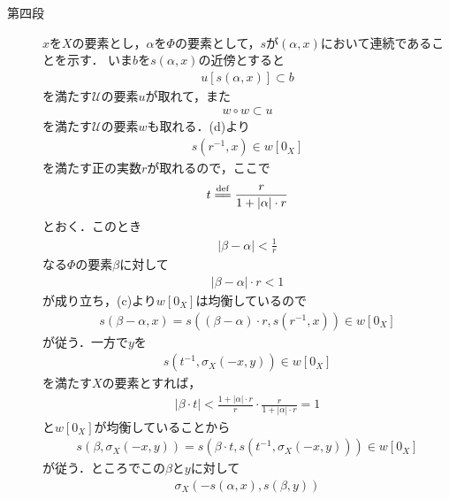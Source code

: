 \begin{sketch}
\begin{description}
			\item[第四段]
				$x$を$X$の要素とし，$\alpha$を$\Phi$の要素として，$s$が$(\alpha,x)$において連続であることを示す．
				いま$b$を$s(\alpha,x)$の近傍とすると
				\begin{align}
					u[s(\alpha,x)] \subset b
				\end{align}
				を満たす$\mathscr{U}$の要素$u$が取れて，また
				\begin{align}
					w \circ w \subset u
				\end{align}
				を満たす$\mathscr{U}$の要素$w$も取れる．(d)より
				\begin{align}
					s\left(r^{-1},x\right) \in w[0_X]
				\end{align}
				を満たす正の実数$r$が取れるので，ここで
				\begin{align}
					t \defeq \frac{r}{1+|\alpha| \cdot r}
				\end{align}
				とおく．このとき
				\begin{align}
					|\beta - \alpha| < \frac{1}{r}
				\end{align}
				なる$\Phi$の要素$\beta$に対して
				\begin{align}
					\left|\beta - \alpha\right| \cdot r < 1
				\end{align}
				が成り立ち，(c)より$w[0_X]$は均衡しているので
				\begin{align}
					s\left(\beta - \alpha,x\right)
					= s\left(\left(\beta - \alpha\right) \cdot r,s\left(r^{-1},x\right)\right)
					\in w[0_X]
					\label{fom:thm_entourages_introducing_vector_topology_2}
				\end{align}
				が従う．一方で$y$を
				\begin{align}
					s\left(t^{-1},\sigma_X\left(-x,y\right)\right) \in w[0_X]
				\end{align}
				を満たす$X$の要素とすれば，
				\begin{align}
					\left|\beta \cdot t\right| < \frac{1 + |\alpha| \cdot r}{r} \cdot \frac{r}{1+|\alpha| \cdot r} = 1
				\end{align}
				と$w[0_X]$が均衡していることから
				\begin{align}
					s\left(\beta,\sigma_X\left(-x,y\right)\right) 
					= s\left(\beta \cdot t,s\left(t^{-1},\sigma_X\left(-x,y\right)\right)\right) \in w[0_X]
					\label{fom:thm_entourages_introducing_vector_topology_3}
				\end{align}
				が従う．ところでこの$\beta$と$y$に対して
				\begin{align}
					\sigma_X\left(-s\left(\alpha,x\right), s\left(\beta,y\right)\right)

\end{align}
\end{description}
\end{sketch}
